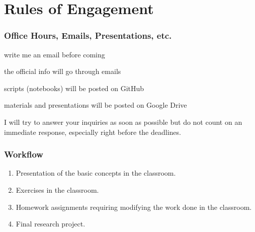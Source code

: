 \documentclass{beamer}
\begin{document}
\begin{frame}
{\begin{center}
        \end{center}
    }
\end{frame}

\section{Rules of Engagement}

\begin{frame}
    \frametitle{Office Hours, Emails, Presentations, etc.}
    \begin{description}
        \item [Office Hours:] write me an email before coming
        \item [Emails:] the official info will go through emails
        \item [GitHub:] scripts (notebooks) will be posted on GitHub
        \item [Google Drive:] materials and presentations will be posted on
        Google Drive
    \end{description}
    \alert{I will try to answer your inquiries as soon as possible but do not
    count on an immediate response, especially right before the deadlines.}
\end{frame}
\begin{frame}
    \frametitle{Workflow}
    \begin{enumerate}
        \item Presentation of the basic concepts in the classroom.
        \item Exercises in the classroom.
        \item Homework assignments requiring modifying the work done in the
        classroom.
        \item Final research project.
    \end{enumerate}
\end{frame}
\end{document}
